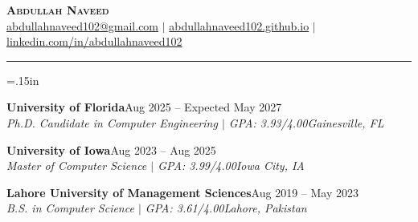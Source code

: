 \documentclass[letterpaper,11pt]{article}
\renewcommand{\section}[1]{\par\vspace{9pt}{\scshape\large #1\par}\vspace{2pt}\hrule\vspace{4pt}}
\newcommand{\resumeEducationSubheading}[4]{\item\textbf{#1}\hfill #2\\\textit{\small #3}\hfill\textit{\small #4}\par}
\newcommand{\resumeEducationListStart}{\begin{list}{}{\leftmargin=.15in\itemsep=2pt\topsep=1pt\parsep=0pt\partopsep=0pt}}
\newcommand{\resumeEducationListEnd}{\end{list}\vspace{-2pt}}
\begin{document}
\begin{center}
  \textbf{\LARGE\scshape Abdullah Naveed}\\[3pt]
  \small
  \href{mailto:abdullahnaveed102@gmail.com}{abdullahnaveed102@gmail.com}
  \hspace{4pt}$|$\hspace{4pt}
  \href{https://abdullahnaveed102.github.io/}{abdullahnaveed102.github.io}
  \hspace{4pt}$|$\hspace{4pt}
  \href{https://www.linkedin.com/in/abdullahnaveed102}{linkedin.com/in/abdullahnaveed102}
\end{center}

\vspace{-20pt}
\section{Education}
\resumeEducationListStart
  \resumeEducationSubheading{University of Florida}{Aug 2025 -- Expected May 2027}{Ph.D. Candidate in Computer Engineering $|$ GPA: 3.93/4.00}{Gainesville, FL}
  \resumeEducationSubheading{University of Iowa}{Aug 2023 -- Aug 2025}{Master of Computer Science $|$ GPA: 3.99/4.00}{Iowa City, IA}
  \resumeEducationSubheading{Lahore University of Management Sciences}{Aug 2019 -- May 2023}{B.S. in Computer Science $|$ GPA: 3.61/4.00}{Lahore, Pakistan}
\resumeEducationListEnd

\vspace{-10pt}
\end{document}
